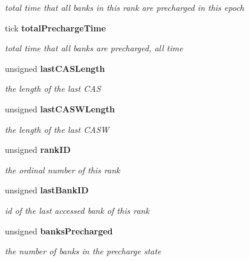 \begin{CompactItemize}
\begin{CompactList}\small\item\em total time that all banks in this rank are precharged in this epoch \item\end{CompactList}\item 
tick {\bf totalPrechargeTime}\label{class_d_r_a_m_sim_i_i_1_1rank__c_4df03aec075a730b93e091e5aae47c7b}

\begin{CompactList}\small\item\em total time that all banks are precharged, all time \item\end{CompactList}\item 
unsigned {\bf lastCASLength}\label{class_d_r_a_m_sim_i_i_1_1rank__c_61a2205bd995b9dd741767f8bba96ace}

\begin{CompactList}\small\item\em the length of the last CAS \item\end{CompactList}\item 
unsigned {\bf lastCASWLength}\label{class_d_r_a_m_sim_i_i_1_1rank__c_422627c294e43ddc2f7df1725a46098f}

\begin{CompactList}\small\item\em the length of the last CASW \item\end{CompactList}\item 
unsigned {\bf rankID}\label{class_d_r_a_m_sim_i_i_1_1rank__c_cf74925229d89061d9d8bdfc28e4ff6a}

\begin{CompactList}\small\item\em the ordinal number of this rank \item\end{CompactList}\item 
unsigned {\bf lastBankID}\label{class_d_r_a_m_sim_i_i_1_1rank__c_8c0a579ea565aab88aa916ed4a63eec5}

\begin{CompactList}\small\item\em id of the last accessed bank of this rank \item\end{CompactList}\item 
unsigned {\bf banksPrecharged}\label{class_d_r_a_m_sim_i_i_1_1rank__c_fd15a73c992889833a95339e640761cf}

\begin{CompactList}\small\item\em the number of banks in the precharge state \item\end{CompactList}\end{CompactItemize}


